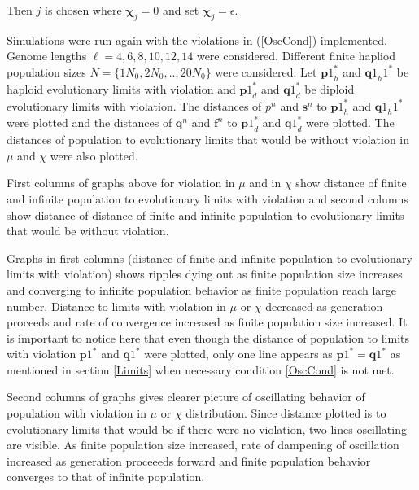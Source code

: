 Then $j$ is chosen where $\bm{\chi}_j = 0$ and set $\bm{\chi}_j = \epsilon$. \newline

Simulations were run again with the violations in (\ref{OscCond}) implemented. Genome lengths $\ell = {4, 6, 8, 10, 12, 14}$ were considered. 
Different finite hapliod population sizes $N = \{1N_0, 2N_0,.., 20N_0\}$ were considered. 
\newline
Let ${\bm{p}1}_h^{\ast}$ and ${\bm{q}1}_h1^{\ast}$ be haploid evolutionary limits with violation and ${\bm{p}1}_d^{\ast}$ and ${\bm{q}1}_d^{\ast}$ be diploid 
evolutionary limits with violation. The distances of ${p}^n$ and $\bm{s}^n$ to ${\bm{p}1}_h^{\ast}$ and ${\bm{q}1}_h1^{\ast}$ were plotted and the distances of 
$\bm{q}^n$ and $\bm{f}^n$ to ${\bm{p}1}_d^{\ast}$ and ${\bm{q}1}_d^{\ast}$ were plotted. The distances of population to evolutionary limits that would be 
without violation in $\mu$ and $\chi$ were also plotted.






First columns of graphs above for violation in $\mu$ and in $\chi$ show distance of finite and infinite population to evolutionary limits with violation and 
second columns show distance of distance of finite and infinite population to evolutionary limits that would be without violation. 

Graphs in first columns (distance of finite and infinite population to evolutionary limits with violation) shows ripples dying out 
as finite population size increases and converging to infinite population behavior as finite population reach large number. Distance to limits with violation in $\mu$ or $\chi$ 
decreased as generation proceeds and rate of convergence increased as finite population size increased. It is important to notice here that 
even though the distance of population to limits with violation ${{\bm p}1}^\ast$ and ${{\bm q}1}^\ast$ were plotted, only one line appears as 
${{\bm p}1}^\ast = {{\bm q}1}^\ast$ as mentioned in section \ref{Limits} when necessary condition \ref{OscCond} is not met. 

Second columns of graphs gives clearer picture of oscillating behavior of population with violation in $\mu$ or $\chi$ distribution. 
Since distance plotted is to evolutionary limits that would be if there were no violation, two lines oscillating are visible. 
As finite population size increased, rate of dampening of oscillation increased as generation proceeeds forward and 
finite population behavior converges to that of infinite population. 

